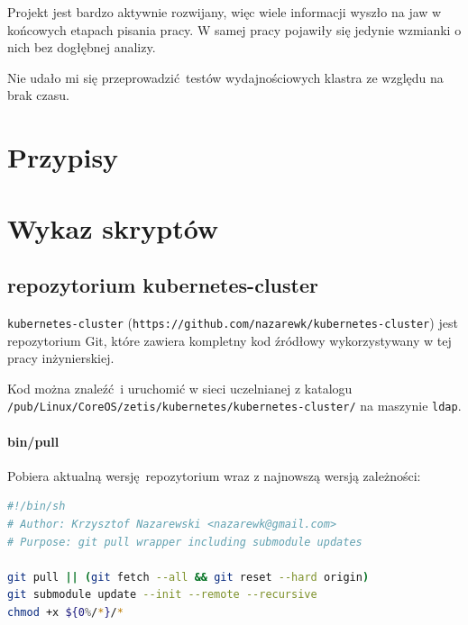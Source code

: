\documentclass[a4paper,12pt,twoside,openany]{report}
\newcommand{\passthrough}[1]{#1}
\begin{document}
Projekt jest bardzo aktywnie rozwijany, więc wiele informacji wyszło na
jaw w końcowych etapach pisania pracy. W samej pracy pojawiły się
jedynie wzmianki o nich bez dogłębnej analizy.

Nie udało mi się przeprowadzić~testów wydajnościowych klastra ze względu
na brak czasu.

\appendix

\hypertarget{przypisy}{%
\chapter{Przypisy}\label{przypisy}}

\theendnotes

\hypertarget{wykaz-skryptuxf3w}{%
\chapter{Wykaz skryptów}\label{wykaz-skryptuxf3w}}

\hypertarget{repozytorium-kubernetes-cluster}{%
\section{repozytorium
kubernetes-cluster}\label{repozytorium-kubernetes-cluster}}

\passthrough{\lstinline!kubernetes-cluster!}
(\passthrough{\lstinline!https://github.com/nazarewk/kubernetes-cluster!})
jest repozytorium Git, które zawiera kompletny kod źródłowy
wykorzystywany w tej pracy inżynierskiej.

Kod można znaleźć~i uruchomić w sieci uczelnianej z katalogu
\passthrough{\lstinline!/pub/Linux/CoreOS/zetis/kubernetes/kubernetes-cluster/!}
na maszynie \passthrough{\lstinline!ldap!}.

\hypertarget{binpull}{%
\subsubsection{bin/pull}\label{binpull}}

Pobiera aktualną wersję~repozytorium wraz z najnowszą wersją zależności:

\begin{lstlisting}[language=bash]
#!/bin/sh
# Author: Krzysztof Nazarewski <nazarewk@gmail.com>
# Purpose: git pull wrapper including submodule updates

git pull || (git fetch --all && git reset --hard origin)
git submodule update --init --remote --recursive
chmod +x ${0%/*}/*
\end{lstlisting}
\end{document}
